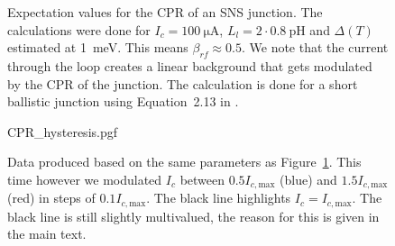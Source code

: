 \begin{figure}[ht!]
	\centering
	
	\caption{Expectation values for the CPR of an SNS junction. The calculations were done for $I_c=\qty{100}{\micro\ampere}$, $L_l=2 \cdot \qty{0.8}{\pico\henry}$ and $\Delta(T)$ estimated at \qty{1}{\milli\electronvolt}. This means $\beta_{rf} \approx 0.5$. We note that the current through the loop creates a linear background that gets modulated by the CPR of the junction. The calculation is done for a short ballistic junction using Equation~2.13 in \cite{vermeerSTMbasedScanningSQUID2021}.}
	\label{fig:CP3.5A-analytical-prediction}
\end{figure}

\begin{figure}
	\centering
	{CPR_hysteresis.pgf}
	\caption{Data produced based on the same parameters as Figure~\ref{fig:CP3.5A-analytical-prediction}. This time however we modulated $I_c$ between $0.5I_{c,\text{max}}$ (blue) and $1.5I_{c,\text{max}}$ (red) in steps of $0.1I_{c,\text{max}}$. The black line highlights $I_c=I_{c,\text{max}}$. The black line is still slightly multivalued, the reason for this is given in the main text.}
	\label{fig:CPR-hysteresis}
\end{figure}

